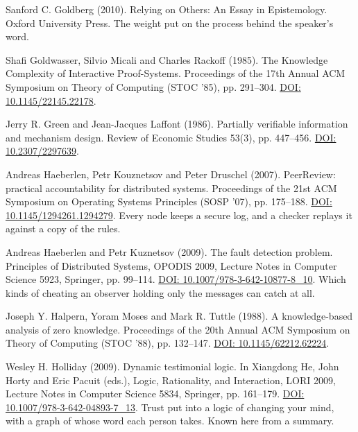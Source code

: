 \documentclass[11pt,twoside]{article}
\theoremstyle{thielethm}
\theoremstyle{thieledef}
\theoremstyle{thieledef}
\theoremstyle{thieledef}
\theoremstyle{thielethm}
\theoremstyle{thieleobs}
\theoremstyle{thielethm}
\begin{document}
\noindent Sanford C. Goldberg (2010). Relying on Others: An Essay in Epistemology. Oxford University Press. The weight put on the process behind the speaker's word.
\par\medskip

\noindent Shafi Goldwasser, Silvio Micali and Charles Rackoff (1985). The Knowledge Complexity of Interactive Proof-Systems. Proceedings of the 17th Annual ACM Symposium on Theory of Computing (STOC '85), pp. 291--304. \href{https://doi.org/10.1145/22145.22178}{DOI: 10.1145/22145.22178}.
\par\medskip

\noindent Jerry R. Green and Jean-Jacques Laffont (1986). Partially verifiable information and mechanism design. Review of Economic Studies 53(3), pp. 447--456. \href{https://doi.org/10.2307/2297639}{DOI: 10.2307/2297639}.
\par\medskip

\noindent Andreas Haeberlen, Petr Kouznetsov and Peter Druschel (2007). PeerReview: practical accountability for distributed systems. Proceedings of the 21st ACM Symposium on Operating Systems Principles (SOSP '07), pp. 175--188. \href{https://doi.org/10.1145/1294261.1294279}{DOI: 10.1145/1294261.1294279}. Every node keeps a secure log, and a checker replays it against a copy of the rules.
\par\medskip

\noindent Andreas Haeberlen and Petr Kuznetsov (2009). The fault detection problem. Principles of Distributed Systems, OPODIS 2009, Lecture Notes in Computer Science 5923, Springer, pp. 99--114. \href{https://doi.org/10.1007/978-3-642-10877-8_10}{DOI: 10.1007/978-3-642-10877-8\_10}. Which kinds of cheating an observer holding only the messages can catch at all.
\par\medskip

\noindent Joseph Y. Halpern, Yoram Moses and Mark R. Tuttle (1988). A knowledge-based analysis of zero knowledge. Proceedings of the 20th Annual ACM Symposium on Theory of Computing (STOC '88), pp. 132--147. \href{https://doi.org/10.1145/62212.62224}{DOI: 10.1145/62212.62224}.
\par\medskip

\noindent Wesley H. Holliday (2009). Dynamic testimonial logic. In Xiangdong He, John Horty and Eric Pacuit (eds.), Logic, Rationality, and Interaction, LORI 2009, Lecture Notes in Computer Science 5834, Springer, pp. 161--179. \href{https://doi.org/10.1007/978-3-642-04893-7_13}{DOI: 10.1007/978-3-642-04893-7\_13}. Trust put into a logic of changing your mind, with a graph of whose word each person takes. Known here from a summary.
\par\medskip
\end{document}
